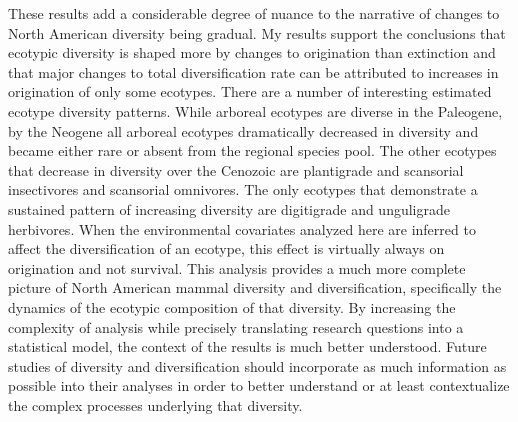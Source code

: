 \documentclass[12pt,letterpaper]{article}
\begin{document}
These results add a considerable degree of nuance to the narrative of changes to North American diversity being gradual. My results support the conclusions that ecotypic diversity is shaped more by changes to origination than extinction and that major changes to total diversification rate can be attributed to increases in origination of only some ecotypes. There are a number of interesting estimated ecotype diversity patterns. While arboreal ecotypes are diverse in the Paleogene, by the Neogene all arboreal ecotypes dramatically decreased in diversity and became either rare or absent from the regional species pool. The other ecotypes that decrease in diversity over the Cenozoic are plantigrade and scansorial insectivores and scansorial omnivores. The only ecotypes that demonstrate a sustained pattern of increasing diversity are digitigrade and unguligrade herbivores. When the environmental covariates analyzed here are inferred to affect the diversification of an ecotype, this effect is virtually always on origination and not survival. This analysis provides a much more complete picture of North American mammal diversity and diversification, specifically the dynamics of the ecotypic composition of that diversity. By increasing the complexity of analysis while precisely translating research questions into a statistical model, the context of the results is much better understood. Future studies of diversity and diversification should incorporate as much information as possible into their analyses in order to better understand or at least contextualize the complex processes underlying that diversity.
\end{document}
